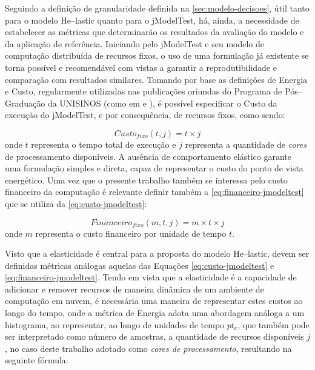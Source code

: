 \documentclass[english,brazilian]{UNISINOSmonografia} %
\begin{document}
Seguindo a definição de granularidade definida na \autoref{sec:modelo-decisoes}, útil tanto para o modelo \textsf{He}--lastic quanto para o jModelTest, há, ainda, a necessidade de estabelecer as métricas que determinarão os resultados da avaliação do modelo e da aplicação de referência.
Iniciando pelo jModelTest e seu modelo de computação distribuída de recursos fixos, o uso de uma formulação já existente se torna possível e recomendável com vistas a garantir a reprodutibilidade e comparação com resultados similares.
Tomando por base as definições de Energia e Custo, regularmente utilizadas nas publicações oriundas do Programa de Pós--Graduação da UNISINOS (como em  e ), é possível especificar o Custo da execução do jModelTest, e por consequência, de recursos fixos, como sendo:

\begin{equation}
\label{eq:custo-jmodeltest}
Custo_{fixo}(t,j) = t \times j
\end{equation}
onde $ t $ representa o tempo total de execução e $ j $ representa a quantidade de \textit{cores} de processamento disponíveis.
A ausência de comportamento elástico garante uma formulação simples e direta, capaz de representar o custo do ponto de vista energético.
Uma vez que o presente trabalho também se interessa pelo custo financeiro da computação é relevante definir também a \autoref{eq:financeiro-jmodeltest} que se utiliza da \autoref{eq:custo-jmodeltest}:

\begin{equation}
\label{eq:financeiro-jmodeltest}
Financeiro_{fixo}(m,t,j) = m \times t \times j
\end{equation}
onde $ m $ representa o custo financeiro por unidade de tempo $ t $.



Visto que a elasticidade é central para a proposta do modelo \textsf{He}--lastic, devem ser definidas métricas análogas aquelas das Equações \ref{eq:custo-jmodeltest} e \ref{eq:financeiro-jmodeltest}.
Tendo em vista que a elasticidade é a capacidade de adicionar e remover recursos de maneira dinâmica de um ambiente de computação em nuvem, é necessária uma maneira de representar estes custos ao longo do tempo, onde a métrica de Energia adota uma abordagem análoga a um histograma, ao representar, ao longo de unidades de tempo $ pt_e $, que também pode ser interpretado como número de amostras, a quantidade de recursos disponíveis $ j $, no caso deste trabalho adotado como \textit{cores de processamento}, resultando na seguinte fórmula:
\end{document}
